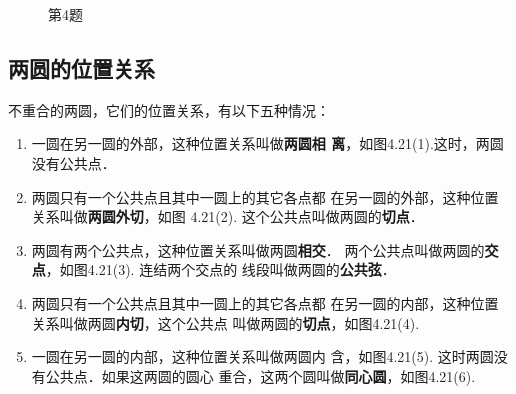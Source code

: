 \begin{figure}[htp]
    \centering
{}
    \caption*{第4题}
\end{figure}

\subsection{两圆的位置关系}
不重合的两圆，它们的位置关系，有以下五种情况：
\begin{enumerate}
\item 一圆在另一圆的外部，这种位置关系叫做\textbf{两圆相
离}，如图4.21(1).这时，两圆没有公共点．
\item 两圆只有一个公共点且其中一圆上的其它各点都
在另一圆的外部，这种位置关系叫做\textbf{两圆外切}，如图
4.21(2). 这个公共点叫做两圆的\textbf{切点}．
\item 两圆有两个公共点，这种位置关系叫做两圆\textbf{相交}．
两个公共点叫做两圆的\textbf{交点}，如图4.21(3). 连结两个交点的
线段叫做两圆的\textbf{公共弦}．
\item 两圆只有一个公共点且其中一圆上的其它各点都
在另一圆的内部，这种位置关系叫做两圆\textbf{内切}，这个公共点
叫做两圆的\textbf{切点}，如图4.21(4).
\item 一圆在另一圆的内部，这种位置关系叫做两圆内
含，如图4.21(5). 这时两圆没有公共点．如果这两圆的圆心
重合，这两个圆叫做\textbf{同心圆}，如图4.21(6).
\end{enumerate}

